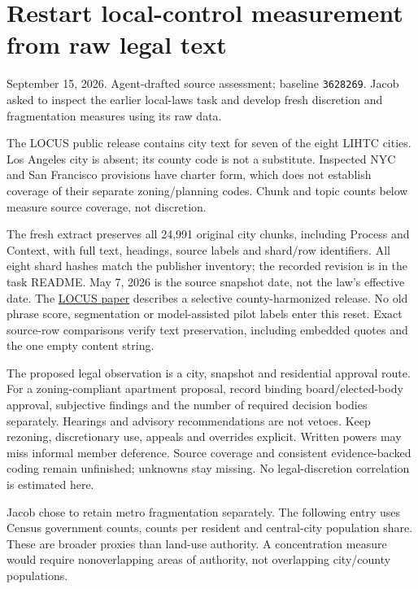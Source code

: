 \documentclass[11pt]{article}
\begin{document}
\section*{Restart local-control measurement from raw legal text}
\noindent September 15, 2026. Agent-drafted source assessment; baseline
\texttt{3628269}. Jacob asked to inspect the earlier local-laws task and develop
fresh discretion and fragmentation measures using its raw data.

The LOCUS public release contains city text for seven of the eight LIHTC cities.
Los Angeles city is absent; its county code is not a substitute. Inspected NYC
and San Francisco provisions have charter form, which does not establish
coverage of their separate zoning/planning codes. Chunk and topic counts below
measure source coverage, not discretion.



The fresh extract preserves all 24,991 original city chunks, including Process
and Context, with full text, headings, source labels and shard/row identifiers.
All eight shard hashes match the publisher inventory; the recorded revision is
in the task README. May 7, 2026 is the source snapshot date, not the law's effective
date. The \href{https://arxiv.org/html/2606.19334v1#S3}{LOCUS paper}
describes a selective county-harmonized release. No old phrase score, segmentation
or model-assisted pilot labels enter this reset. Exact source-row comparisons
verify text preservation, including embedded quotes and the one empty content string.

The proposed legal observation is a city, snapshot and residential approval route.
For a zoning-compliant apartment proposal, record binding board/elected-body
approval, subjective findings and the number of required decision bodies separately.
Hearings and advisory recommendations are not vetoes. Keep rezoning, discretionary
use, appeals and overrides explicit. Written powers may miss informal member deference.
Source coverage and consistent evidence-backed coding remain unfinished; unknowns
stay missing. No legal-discretion correlation is estimated here.

Jacob chose to retain metro fragmentation separately. The following entry uses
Census government counts, counts per resident and central-city population share.
These are broader proxies than land-use authority. A concentration measure would
require nonoverlapping areas of authority, not overlapping city/county populations.
\end{document}
